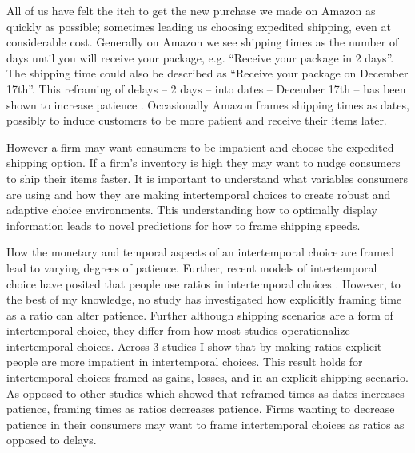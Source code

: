 \documentclass[]{article}
\begin{document}
All of us have felt the itch to get the new purchase we made on Amazon as quickly as possible; sometimes leading us choosing expedited shipping, even at considerable cost. 
Generally on Amazon we see shipping times as the number of days until you will receive your package, e.g.  ``Receive your package in 2 days''. 
The shipping time could also be described as ``Receive your package on December 17th''. 
This reframing of delays -- 2 days -- into dates -- December 17th -- has been shown to increase patience \cite{Read2005}.
Occasionally Amazon frames shipping times as dates, possibly to induce customers to be more patient and receive their items later. 

However a firm may want consumers to be impatient and choose the expedited shipping option. 
If a firm's inventory is high they may want to nudge consumers to ship their items faster. 
It is important to understand what variables consumers are using and how they are making intertemporal choices to create robust and adaptive choice environments. 
This understanding how to optimally display information leads to novel predictions for how to frame shipping speeds. 

How the monetary and temporal aspects of an intertemporal choice are framed lead to varying degrees of patience.
Further, recent models of intertemporal choice have posited that people use ratios in intertemporal choices \cite{Read2013, MarzilliEricson2015}. 
However, to the best of my knowledge, no study has investigated how explicitly framing time as a ratio can alter patience.
Further although shipping scenarios are a form of intertemporal choice, they differ from how most studies operationalize intertemporal choices. 
Across 3 studies I show that by making ratios explicit people are more impatient in intertemporal choices. 
This result holds for intertemporal choices framed as gains, losses, and in an explicit shipping scenario. 
As opposed to other studies which showed that reframed times as dates increases patience, framing times as ratios decreases patience.
Firms wanting to decrease patience in their consumers may want to frame intertemporal choices as ratios as opposed to delays.
 

\end{document}
